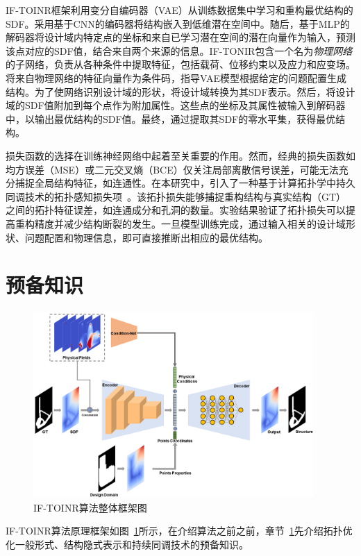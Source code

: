 IF-TOINR框架利用变分自编码器（VAE）从训练数据集中学习和重构最优结构的SDF。采用基于CNN的编码器将结构嵌入到低维潜在空间中。随后，基于MLP的解码器将设计域内特定点的坐标和来自已学习潜在空间的潜在向量作为输入，预测该点对应的SDF值，结合来自两个来源的信息。IF-TONIR包含一个名为\textit{物理网络}的子网络，负责从各种条件中提取特征，包括载荷、位移约束以及应力和应变场。将来自物理网络的特征向量作为条件码，指导VAE模型根据给定的问题配置生成结构。为了使网络识别设计域的形状，将设计域转换为其SDF表示。然后，将设计域的SDF值附加到每个点作为附加属性。这些点的坐标及其属性被输入到解码器中，以输出最优结构的SDF值。最终，通过提取其SDF的零水平集，获得最优结构。

损失函数的选择在训练神经网络中起着至关重要的作用。然而，经典的损失函数如均方误差（MSE）或二元交叉熵（BCE）仅关注局部离散信号误差，可能无法充分捕捉全局结构特征，如连通性。在本研究中，引入了一种基于计算拓扑学中持久同调技术的拓扑感知损失项~\cite{persistent2008}。该拓扑损失能够捕捉重构结构与真实结构（GT）之间的拓扑特征误差，如连通成分和孔洞的数量。实验结果验证了拓扑损失可以提高重构精度并减少结构断裂的发生。一旦模型训练完成，通过输入相关的设计域形状、问题配置和物理信息，即可直接推断出相应的最优结构。

\section{预备知识}\label{sec:preliminary}
\begin{figure}[t!]
    \centering
    \includegraphics[width=0.95\textwidth]{./figures/TONIR/0-network-1.png}
    \caption{IF-TOINR算法整体框架图}
    \label{fig:network}
\end{figure}

IF-TOINR算法原理框架如图~\ref{fig:network}所示，在介绍算法之前之前，章节~\ref{sec:preliminary}先介绍拓扑优化一般形式、结构隐式表示和持续同调技术的预备知识。

